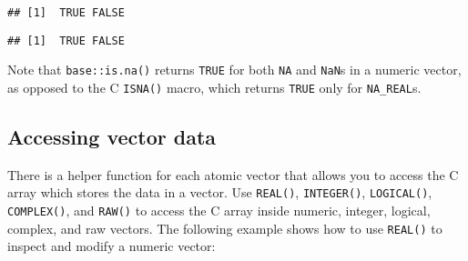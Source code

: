 \begin{verbatim}
## [1]  TRUE FALSE
\end{verbatim}

\begin{Shaded}
\begin{Highlighting}[]
\NormalTok{(}\NormalTok{(}\NormalTok{, }\NormalTok{))}
\end{Highlighting}
\end{Shaded}

\begin{verbatim}
## [1]  TRUE FALSE
\end{verbatim}

Note that \texttt{base::is.na()} returns \texttt{TRUE} for both
\texttt{NA} and \texttt{NaN}s in a numeric vector, as opposed to the C
\texttt{ISNA()} macro, which returns \texttt{TRUE} only for
\texttt{NA\_REAL}s.

\hypertarget{accessing-vector-data}{%
\subsection{Accessing vector data}\label{accessing-vector-data}}

There is a helper function for each atomic vector that allows you to
access the C array which stores the data in a vector. Use
\texttt{REAL()}, \texttt{INTEGER()}, \texttt{LOGICAL()},
\texttt{COMPLEX()}, and \texttt{RAW()} to access the C array inside
numeric, integer, logical, complex, and raw vectors. The following
example shows how to use \texttt{REAL()} to inspect and modify a numeric
vector: 

\begin{Shaded}
\begin{Highlighting}[]
\StringTok{ }\NormalTok{(}\NormalTok{(} \NormalTok{), }
\StringTok{  }
\StringTok{  \}}

\NormalTok{)}
\NormalTok{(}\NormalTok{(}\OperatorTok{:}\NormalTok{))}
\end{Highlighting}
\end{Shaded}

